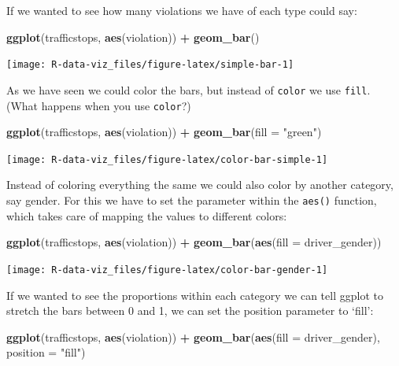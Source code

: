 \documentclass[]{book}
\newenvironment{Shaded}{\begin{snugshade}}{\end{snugshade}}
\newcommand{\KeywordTok}[1]{\textcolor[rgb]{0.13,0.29,0.53}{\textbf{#1}}}
\newcommand{\DataTypeTok}[1]{\textcolor[rgb]{0.13,0.29,0.53}{#1}}
\newcommand{\StringTok}[1]{\textcolor[rgb]{0.31,0.60,0.02}{#1}}
\newcommand{\OperatorTok}[1]{\textcolor[rgb]{0.81,0.36,0.00}{\textbf{#1}}}
\newcommand{\NormalTok}[1]{#1}
\theoremstyle{definition}
\theoremstyle{definition}
\theoremstyle{definition}
\theoremstyle{remark}
\begin{document}
If we wanted to see how many violations we have of each type could say:

\begin{Shaded}
\begin{Highlighting}[]
\KeywordTok{ggplot}\NormalTok{(trafficstops, }\KeywordTok{aes}\NormalTok{(violation)) }\OperatorTok{+}\StringTok{ }
\StringTok{  }\KeywordTok{geom_bar}\NormalTok{()}
\end{Highlighting}
\end{Shaded}

\texttt{[image: R-data-viz\_files/figure-latex/simple-bar-1]}

As we have seen we could color the bars, but instead of \texttt{color}
we use \texttt{fill}. (What happens when you use \texttt{color}?)

\begin{Shaded}
\begin{Highlighting}[]
\KeywordTok{ggplot}\NormalTok{(trafficstops, }\KeywordTok{aes}\NormalTok{(violation)) }\OperatorTok{+}\StringTok{ }
\StringTok{  }\KeywordTok{geom_bar}\NormalTok{(}\DataTypeTok{fill =} \StringTok{"green"}\NormalTok{)}
\end{Highlighting}
\end{Shaded}

\texttt{[image: R-data-viz\_files/figure-latex/color-bar-simple-1]}

Instead of coloring everything the same we could also color by another
category, say gender. For this we have to set the parameter within the
\texttt{aes()} function, which takes care of mapping the values to
different colors:

\begin{Shaded}
\begin{Highlighting}[]
\KeywordTok{ggplot}\NormalTok{(trafficstops, }\KeywordTok{aes}\NormalTok{(violation)) }\OperatorTok{+}\StringTok{ }
\StringTok{  }\KeywordTok{geom_bar}\NormalTok{(}\KeywordTok{aes}\NormalTok{(}\DataTypeTok{fill =}\NormalTok{ driver_gender))}
\end{Highlighting}
\end{Shaded}

\texttt{[image: R-data-viz\_files/figure-latex/color-bar-gender-1]}

If we wanted to see the proportions within each category we can tell
ggplot to stretch the bars between 0 and 1, we can set the position
parameter to `fill':

\begin{Shaded}
\begin{Highlighting}[]
\KeywordTok{ggplot}\NormalTok{(trafficstops, }\KeywordTok{aes}\NormalTok{(violation)) }\OperatorTok{+}\StringTok{ }
\StringTok{  }\KeywordTok{geom_bar}\NormalTok{(}\KeywordTok{aes}\NormalTok{(}\DataTypeTok{fill =}\NormalTok{ driver_gender), }\DataTypeTok{position =} \StringTok{"fill"}\NormalTok{)}
\end{Highlighting}
\end{Shaded}
\end{document}
